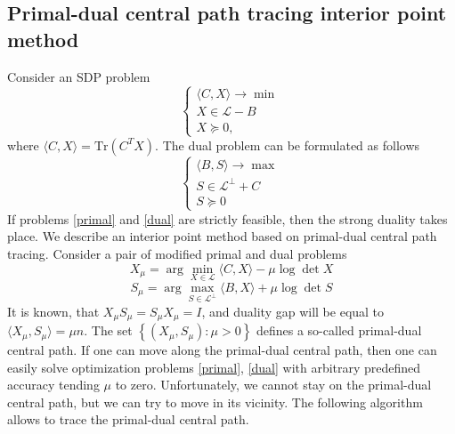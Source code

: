 \documentclass[12pt]{article}
\begin{document}
\subsection{Primal-dual central path tracing interior point method}

Consider an SDP problem
\begin{equation}
\label{primal}
	\begin{cases}
		\langle C, X \rangle \longrightarrow \min \\
		X \in \mathcal L - B \\
		X \succeq 0,
	\end{cases}
\end{equation}
where $\langle C, X \rangle  = \text{Tr}(C^T X)$.
The dual problem can be formulated as follows
\begin{equation}
\label{dual}
	\begin{cases}
		\langle B, S \rangle \longrightarrow \max \\
		S \in \mathcal L^\perp + C \\
		S \succeq 0
	\end{cases}
\end{equation}
If problems \ref{primal} and \ref{dual} are strictly feasible, then the strong duality takes 
place.
We describe an interior point method based on primal-dual central path tracing.
Consider a pair of modified primal and dual problems
\begin{equation}
	X_\mu = \arg\min\limits_{X \in \mathcal L} \langle C, X \rangle - \mu \log\det X
\end{equation}
\begin{equation}
	S_\mu = \arg\max\limits_{S \in \mathcal L^\perp} \langle B, X \rangle + \mu \log\det S
\end{equation}
It is known, that $X_\mu S_\mu = S_\mu X_\mu = I$, and duality gap will be equal to 
$\langle X_\mu, S_\mu \rangle = \mu n$.
The set $\left\{ (X_\mu, S_\mu) : \mu > 0 \right\}$ defines a so-called primal-dual central 
path.
If one can move along the primal-dual central path, then one can easily solve 
optimization problems \ref{primal}, \ref{dual} with arbitrary predefined accuracy tending 
$\mu$ to zero.
Unfortunately, we cannot stay on the primal-dual central path, but we can try to move in 
its vicinity.
The following algorithm allows to trace the primal-dual central path.
\end{document}

